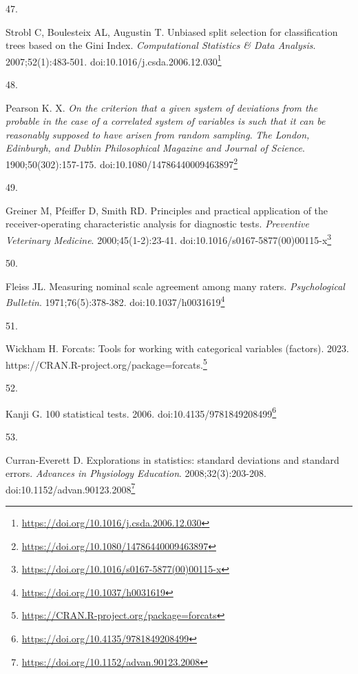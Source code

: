 \documentclass[
]{book}
\newlength{\cslhangindent}
\newlength{\csllabelwidth}
\newlength{\cslentryspacingunit} %
\newenvironment{CSLReferences}[2] %
 {%
  \setlength{\parindent}{0pt}
  \ifodd #1
  \let\oldpar\par
  \def\par{\hangindent=\cslhangindent\oldpar}
  \fi
  \setlength{\parskip}{#2\cslentryspacingunit}
 }%
 {}
\newcommand{\CSLLeftMargin}[1]{\parbox[t]{\csllabelwidth}{#1}}
\newcommand{\CSLRightInline}[1]{\parbox[t]{\linewidth - \csllabelwidth}{#1}\break}
\renewcommand{\href}[2]{#2\footnote{\url{#1}}}
\begin{document}
\begin{CSLReferences}{0}{0}
\leavevmode{}%
\CSLLeftMargin{47. }%
\CSLRightInline{Strobl C, Boulesteix AL, Augustin T. Unbiased split selection for classification trees based on the Gini Index. \emph{Computational Statistics \& Data Analysis}. 2007;52(1):483-501. doi:\href{https://doi.org/10.1016/j.csda.2006.12.030}{10.1016/j.csda.2006.12.030}}

\leavevmode{}%
\CSLLeftMargin{48. }%
\CSLRightInline{Pearson K. X. {\emph{On the criterion that a given system of deviations from the probable in the case of a correlated system of variables is such that it can be reasonably supposed to have arisen from random sampling}}. \emph{The London, Edinburgh, and Dublin Philosophical Magazine and Journal of Science}. 1900;50(302):157-175. doi:\href{https://doi.org/10.1080/14786440009463897}{10.1080/14786440009463897}}

\leavevmode{}%
\CSLLeftMargin{49. }%
\CSLRightInline{Greiner M, Pfeiffer D, Smith RD. Principles and practical application of the receiver-operating characteristic analysis for diagnostic tests. \emph{Preventive Veterinary Medicine}. 2000;45(1-2):23-41. doi:\href{https://doi.org/10.1016/s0167-5877(00)00115-x}{10.1016/s0167-5877(00)00115-x}}

\leavevmode{}%
\CSLLeftMargin{50. }%
\CSLRightInline{Fleiss JL. Measuring nominal scale agreement among many raters. \emph{Psychological Bulletin}. 1971;76(5):378-382. doi:\href{https://doi.org/10.1037/h0031619}{10.1037/h0031619}}

\leavevmode{}%
\CSLLeftMargin{51. }%
\CSLRightInline{Wickham H. Forcats: Tools for working with categorical variables (factors). 2023. \href{https://CRAN.R-project.org/package=forcats}{https://CRAN.R-project.org/package=forcats.}}

\leavevmode{}%
\CSLLeftMargin{52. }%
\CSLRightInline{Kanji G. 100 statistical tests. 2006. doi:\href{https://doi.org/10.4135/9781849208499}{10.4135/9781849208499}}

\leavevmode{}%
\CSLLeftMargin{53. }%
\CSLRightInline{Curran-Everett D. Explorations in statistics: standard deviations and standard errors. \emph{Advances in Physiology Education}. 2008;32(3):203-208. doi:\href{https://doi.org/10.1152/advan.90123.2008}{10.1152/advan.90123.2008}}


\end{CSLReferences}
\end{document}
